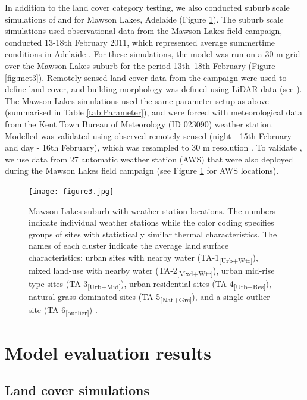 \documentclass[final,3p,times,authoryear]{elsarticle}
\newcommand{\subs}{\textsubscript}
\newcommand{\TAone}{TA-1\subs{[Urb+Wtr]}}
\newcommand{\TAtwo}{TA-2\subs{[Mxd+Wtr]}}
\newcommand{\TAthree}{TA-3\subs{[Urb+Mid]}}
\newcommand{\TAfour}{TA-4\subs{[Urb+Res]}}
\newcommand{\TAfive}{TA-5\subs{[Nat+Grs]}}
\newcommand{\TAsix}{TA-6\subs{[outlier]}}
\begin{document}
In addition to the land cover category testing, we also conducted suburb scale simulations of  and  for Mawson Lakes, Adelaide (Figure \ref{fig:mawson}). The suburb scale simulations used observational data from the Mawson Lakes field campaign, conducted 13-18th February 2011, which represented average summertime conditions in Adelaide \citep{Broadbent2017}. For these simulations, the model was run on a 30 m grid over the Mawson Lakes suburb for the period 13th--18th February (Figure \ref{fig:met3}).  Remotely sensed land cover data from the campaign were used to define land cover, and building morphology was defined using LiDAR data (see \cite{Broadbent2017}). The Mawson Lakes simulations used the same parameter setup as above (summarised in Table \ref{tab:Parameter}), and were forced with meteorological data from the Kent Town Bureau of Meteorology (ID 023090) weather station. Modelled  was validated using observed remotely sensed  (night - 15th February and day - 16th February), which was resampled to 30 m resolution \citep{Broadbent2017}. To validate , we use data from 27 automatic weather station (AWS) that were also deployed during the Mawson Lakes field campaign (see Figure \ref{fig:mawson} for AWS locations). 
 


\begin{figure}[!htbp]
\begin{center}
\texttt{[image: figure3.jpg]}
 \caption{Mawson Lakes suburb with weather station locations. The numbers indicate individual weather stations while the color coding specifies groups of sites with statistically similar thermal characteristics.  The  names of each cluster indicate the average land surface characteristics: urban sites with nearby water (\TAone), mixed land-use with nearby water (\TAtwo), urban mid-rise type sites (\TAthree), urban residential sites (\TAfour), natural grass dominated sites (\TAfive), and a single outlier site (\TAsix)  \citep{Broadbent2017}.} \label{fig:mawson}
\end{center} 
\end{figure}




\section{Model evaluation results}\label{sec:Results} 
\subsection{Land cover simulations}\label{sec:landcoverresult} 
\end{document}
